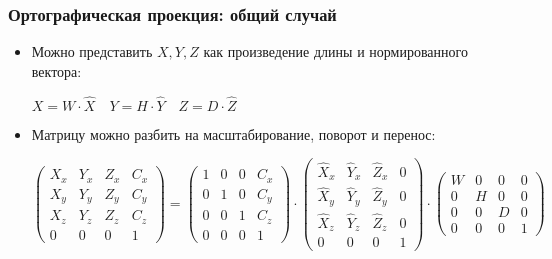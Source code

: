 \documentclass[10pt]{beamer}
\begin{document}
\begin{frame}[fragile]
\frametitle{Ортографическая проекция: общий случай}
\begin{itemize}
\item Можно представить \begin{math}X, Y, Z\end{math} как произведение длины и нормированного вектора:
\begin{center}
\begin{math}X = W \cdot \hat X \quad Y = H \cdot \hat Y \quad Z = D \cdot \hat Z\end{math}
\end{center}
\pause
\item Матрицу можно разбить на масштабирование, поворот и перенос:
\begin{center}
\begin{math}
\begin{pmatrix}
X_x & Y_x & Z_x & C_x \\
X_y & Y_y & Z_y & C_y \\
X_z & Y_z & Z_z & C_z \\
0 & 0 & 0 & 1
\end{pmatrix}
=
\begin{pmatrix}
1 & 0 & 0 & C_x \\
0 & 1 & 0 & C_y \\
0 & 0 & 1 & C_z \\
0 & 0 & 0 & 1
\end{pmatrix}
\cdot
\begin{pmatrix}
\hat X_x & \hat Y_x & \hat Z_x & 0 \\
\hat X_y & \hat Y_y & \hat Z_y & 0 \\
\hat X_z & \hat Y_z & \hat Z_z & 0 \\
0 & 0 & 0 & 1
\end{pmatrix}
\cdot
\begin{pmatrix}
W & 0 & 0 & 0 \\
0 & H & 0 & 0 \\
0 & 0 & D & 0 \\
0 & 0 & 0 & 1
\end{pmatrix}
\end{math}
\end{center}
\end{itemize}
\end{frame}
\end{document}
